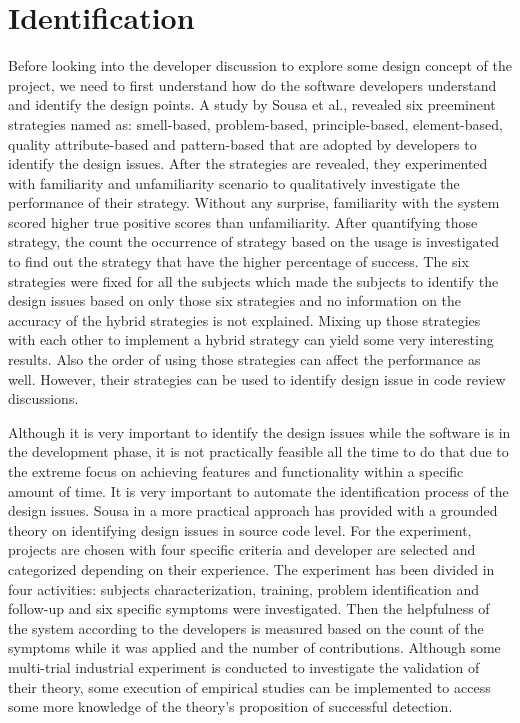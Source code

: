 \section{Identification}
\label{sect:identification}

Before looking into the developer discussion to explore some design concept of the project, we need to first understand how do the software developers understand and identify the design points. A study by Sousa et al.,\cite{Sousa2017} revealed six preeminent strategies named as: smell-based, problem-based, principle-based, element-based, quality attribute-based and pattern-based that are adopted by developers to identify the design issues. After the strategies are revealed, they experimented with familiarity and unfamiliarity scenario to qualitatively investigate the performance of their strategy. Without any surprise, familiarity with the system scored higher true positive scores than unfamiliarity. After quantifying those strategy, the count the occurrence of strategy based on the usage is investigated to find out the strategy that have the higher percentage of success. The six strategies were fixed for all the subjects which made the subjects to identify the design issues based on only those six strategies and no information on the accuracy of the hybrid strategies is not explained. Mixing up those strategies with each other to implement a hybrid strategy can yield some very interesting results. Also the order of using those strategies can affect the performance as well. However, their strategies can be used to identify design issue in code review discussions.
     
Although it is very important to identify the design issues while the software is in the development phase, it is not practically feasible all the time to do that due to the extreme focus on achieving features and functionality within a specific amount of time. It is very important to automate the identification process of the design issues. Sousa in a more practical approach \cite{Sousa2018} has provided with a grounded theory on identifying design issues in source code level. For the experiment, projects are chosen with four specific criteria and developer are selected and categorized depending on their experience. The experiment has been divided in four activities: subjects characterization, training, problem identification and follow-up and six specific symptoms were investigated. Then the helpfulness of the system according to the developers is measured based on the count of the symptoms while it was applied and the number of contributions. Although some multi-trial industrial experiment is conducted to investigate the validation of their theory, some execution of empirical studies can be implemented to access some more knowledge of the theory's proposition of successful detection.

